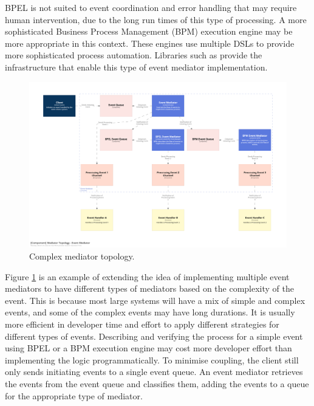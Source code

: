 BPEL is not suited to event coordination and error handling that may require human intervention, due to the long run times of this type of processing.
A more sophisticated Business Process Management (BPM) execution engine may be more appropriate in this context.
These engines use multiple DSLs to provide more sophisticated process automation.
Libraries such as  provide the infrastructure that enable this type of event mediator implementation.

\begin{figure}[h!]
    \begin{adjustwidth}{-10mm}{-10mm}
        \centering
        \includegraphics[trim=195 230 195 162,clip,width=0.97\paperwidth]{diagrams/complex-mediator-components.png}
    \end{adjustwidth}
    \caption{Complex mediator topology.}
    \label{fig:complex-mediator-components}
\end{figure}

Figure \ref{fig:complex-mediator-components} is an example of extending the idea of implementing multiple event mediators
to have different types of mediators based on the complexity of the event.
This is because most large systems will have a mix of simple and complex events, and some of the complex events may have long durations.
It is usually more efficient in developer time and effort to apply different strategies for different types of events.
Describing and verifying the process for a simple event using BPEL or a BPM execution engine
may cost more developer effort than implementing the logic programmatically.
To minimise coupling, the client still only sends initiating events to a single event queue.
An event mediator retrieves the events from the event queue and classifies them,
adding the events to a queue for the appropriate type of mediator.


